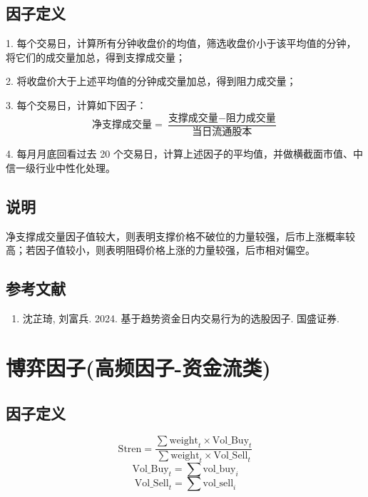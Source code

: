 \documentclass{article}
\begin{document}
\subsection{因子定义}

1. 每个交易日，计算所有分钟收盘价的均值，筛选收盘价小于该平均值的分钟，将它们的成交量加总，得到支撑成交量；

2. 将收盘价大于上述平均值的分钟成交量加总，得到阻力成交量；

3. 每个交易日，计算如下因子：
\begin{equation}
    \text{净支撑成交量} = \frac{\text{支撑成交量} - \text{阻力成交量}}{\text{当日流通股本}}
\end{equation}

4. 每月月底回看过去 20 个交易日，计算上述因子的平均值，并做横截面市值、中信一级行业中性化处理。

\subsection{说明}
净支撑成交量因子值较大，则表明支撑价格不破位的力量较强，后市上涨概率较高；若因子值较小，则表明阻碍价格上涨的力量较强，后市相对偏空。

\subsection{参考文献}
\begin{enumerate}
    \item 沈芷琦, 刘富兵. 2024. 基于趋势资金日内交易行为的选股因子. 国盛证券.
\end{enumerate}

\section{博弈因子(高频因子-资金流类)}

\subsection{因子定义}
\begin{equation}
    \mathrm{Stren} = \frac{\sum \mathrm{weight}_t \times \mathrm{Vol\_Buy}_t}{\sum \mathrm{weight}_t \times \mathrm{Vol\_Sell}_t}
\end{equation}
\begin{equation}
    \mathrm{Vol\_Buy}_t = \sum \mathrm{vol\_buy}_i
\end{equation}
\begin{equation}
    \mathrm{Vol\_Sell}_t = \sum \mathrm{vol\_sell}_i
\end{equation}
\end{document}
